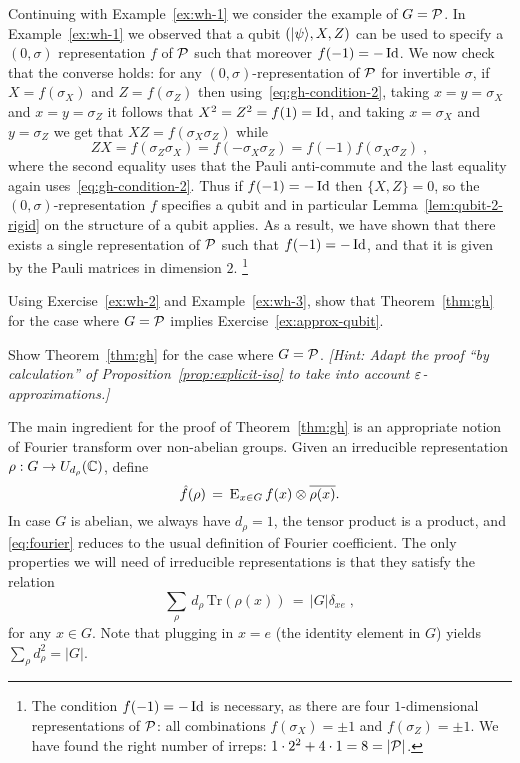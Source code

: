 \begin{example}\label{ex:wh-3}
Continuing with Example~\ref{ex:wh-1} we consider the example of $G= \mathcal{P}$. In Example~\ref{ex:wh-1} we observed that a qubit $(|\psi\rangle,X,Z)$ can be used to specify a $(0,\sigma)$ representation $f$ of $\mathcal{P}$ such that moreover $f(-1)=-\mathop{\rm Id}\nolimits$. We now check that the converse holds: for any $(0,\sigma)$-representation of $\mathcal{P}$ for invertible $\sigma$, if $X=f(\sigma_X)$ and $Z=f(\sigma_Z)$ then using~\eqref{eq:gh-condition-2}, taking $x=y=\sigma_X$ and $x=y=\sigma_Z$ it follows that $X^2 = Z^2=f(1)=\mathop{\rm Id}\nolimits$, and taking $x=\sigma_X$ and $y=\sigma_Z$ we get that $XZ=f(\sigma_X \sigma_Z)$ while 
\[ZX=f(\sigma_Z\sigma_X)=f(-\sigma_X\sigma_Z)=f(-1)f(\sigma_X\sigma_Z)\;,\]
where the second equality uses that the Pauli anti-commute and the last equality again uses~\eqref{eq:gh-condition-2}. Thus if $f(-1)=-\mathop{\rm Id}\nolimits$ then 
 $\{X,Z\}=0$, so the $(0,\sigma)$-representation $f$ specifies a qubit and in particular Lemma~\ref{lem:qubit-2-rigid} on the structure of a qubit applies. As a result, we have shown that there exists a single  representation of $\mathcal{P}$ such that $f(-1)=-\mathop{\rm Id}\nolimits$, and that it is given by the Pauli matrices in dimension $2$. 
\footnote{The condition $f(-1)=-\mathop{\rm Id}\nolimits$ is necessary, as there are four $1$-dimensional representations of $\mathcal{P}$: all combinations $f(\sigma_X)=\pm 1$ and $f(\sigma_Z)=\pm 1$. We have found the right number of irreps: $1\cdot 2^2 + 4\cdot 1 = 8 = |\mathcal{P}|$.}
\end{example}

\begin{exercise}
Using Exercise~\ref{ex:wh-2} and Example~\ref{ex:wh-3}, show that Theorem~\ref{thm:gh} for the case where $G=\mathcal{P}$ implies Exercise~\ref{ex:approx-qubit}. 
\end{exercise}

\begin{exercise}
Show Theorem~\ref{thm:gh} for the case where $G=\mathcal{P}$. \emph{[Hint: Adapt the proof ``by calculation''
of Proposition~\ref{prop:explicit-iso} to take into account $\varepsilon$-approximations.]}
\end{exercise}

The main ingredient for the proof of Theorem~\ref{thm:gh} is an appropriate notion of Fourier transform over non-abelian groups. Given an irreducible representation $\rho: G \to U_{d_\rho}(\mathbb{C})$, define 
\begin{equation}\label{eq:fourier}
 \hat{f}(\rho) \,=\, \textsc{E}_{x\in G} \,f(x) \otimes \overline{\rho(x)}.
\end{equation}
In case $G$ is abelian, we always have $d_\rho=1$, the tensor product is a product, and \eqref{eq:fourier} reduces to the usual definition of Fourier coefficient. The only properties we will need of irreducible representations is that they satisfy the relation
\begin{equation}\label{eq:ortho}
\sum_\rho \,d_\rho\,\mathrm{Tr}(\rho(x)) \,=\, |G|\delta_{xe}\;,
\end{equation}
for any $x\in G$. Note that plugging in $x=e$ (the identity element in $G$) yields $\sum_\rho d_\rho^2= |G|$. 

